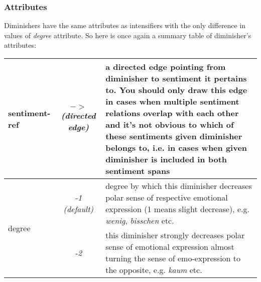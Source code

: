 \documentclass[11pt,a4paper]{article}
\begin{document}
\subsubsection{Attributes}
Diminishers have the same attributes as intensifiers with the only
difference in values of \textit{degree} attribute. So here is once
again a summary table of diminisher's attributes:

\begin{tabular}{|l|c|p{}|}\hline
  sentiment-ref & \textit{$->$\newline(directed edge)} & a directed
  edge pointing from diminisher to sentiment it pertains to. You
  should only draw this edge in cases when multiple sentiment
  relations overlap with each other and it's not obvious to which of
  these sentiments given diminisher belongs to, i.e. in cases when
  given diminisher is included in both sentiment spans\\\hline


  \multirow{2}{*}{degree} & \textit{-1 (default)} & degree by which
  this diminisher decreases polar sense of respective emotional
  expression (1 means slight decrease), e.g. \textit{wenig},
  \textit{bisschen} etc.\\\cline{2-3}

  & \textit{-2} & this diminisher strongly decreases polar sense of
  emotional expression almost turning the sense of emo-expression to
  the opposite, e.g. \textit{kaum} etc.\\\hline
\end{tabular}
\end{document}

